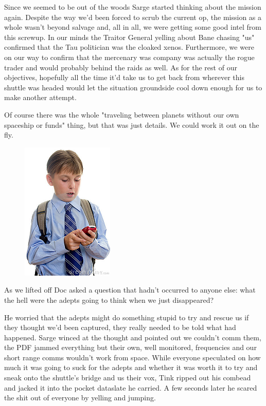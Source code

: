 Since we seemed to be out of the woods Sarge started thinking about the mission again. 
Despite the way we'd been forced to scrub the current op, the mission as a whole wasn't beyond salvage and, all in all, we were getting some good intel from this screwup. 
In our minds the Traitor General yelling about Bane chasing "us" confirmed that the Tau politician was the cloaked xenos. 
Furthermore, we were on our way to confirm that the mercenary was company was actually the rogue trader and would probably behind the raids as well. 
As for the rest of our objectives, hopefully all the time it'd take us to get back from wherever this shuttle was headed would let the situation groundside cool down enough for us to make another attempt.

Of course there was the whole "traveling between planets without our own spaceship or funds" thing, but that was just details. 
We could work it out on the fly.

\begin{figure}
	\begin{center}
		\includegraphics[width=\figwidth]{pics/10/55.png}
	\end{center}
\end{figure}
As we lifted off Doc asked a question that hadn't occurred to anyone else: 
what the hell were the adepts going to think when we just disappeared? 


He worried that the adepts might do something stupid to try and rescue us if they thought we'd been captured, they really needed to be told what had happened. 
Sarge winced at the thought and pointed out we couldn't comm them, the PDF jammed everything but their own, well monitored, frequencies and our short range comms wouldn't work from space. 
While everyone speculated on how much it was going to suck for the adepts and whether it was worth it to try and sneak onto the shuttle's bridge and us their vox, Tink ripped out his combead and jacked it into the pocket dataslate he carried. 
A few seconds later he scared the shit out of everyone by yelling and jumping.

